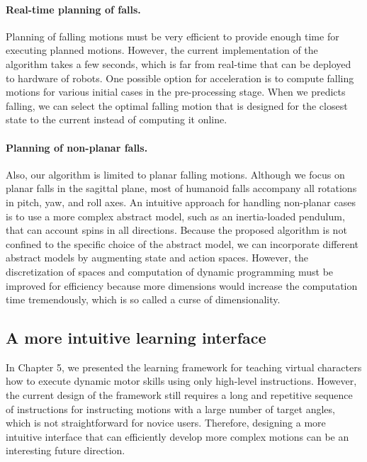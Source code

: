 \paragraph{Real-time planning of falls.}
Planning of falling motions must be very efficient to provide enough time for
executing planned motions. 
However, the current implementation of the algorithm takes a few seconds, which
is far from real-time that can be deployed to hardware of robots.
One possible option for acceleration is to compute falling motions for
various initial cases in the pre-processing stage.
When we predicts falling, we can select the optimal falling motion
that is designed for the closest state to the current 
instead of computing it online.

\paragraph{Planning of non-planar falls.}
Also, our algorithm is limited to planar falling motions.
Although we focus on planar falls in the sagittal plane, most of humanoid falls
accompany all rotations in pitch, yaw, and roll axes.
An intuitive approach for handling non-planar cases is to use a more complex
abstract model, such as an inertia-loaded pendulum, that can account spins in
all directions.
Because the proposed algorithm is not confined to the specific choice of the
abstract model, we can incorporate different abstract models by augmenting
state and action spaces. 
However, the discretization of spaces and computation of dynamic programming
must be improved for efficiency because more dimensions would increase the
computation time tremendously, which is so called a curse of dimensionality. 

\subsection{A more intuitive learning interface}

In Chapter 5, we presented the learning framework for teaching
virtual characters how to execute dynamic motor skills using only high-level
instructions. 
However, the current design of the framework still requires a long and
repetitive sequence of instructions for instructing motions with a large 
number of target angles, which is not straightforward for novice users. 
Therefore, designing a more intuitive interface that can efficiently develop
more complex motions can be an interesting future direction.

